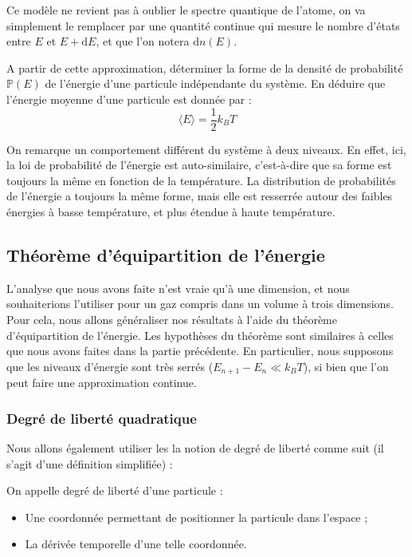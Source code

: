 \documentclass[11pt,fleqn]{book} %
\newcommand{\dd}{\mathrm{d}}
\begin{document}
Ce modèle ne revient pas à oublier le spectre quantique de l'atome, on va simplement le remplacer par une quantité continue qui mesure le nombre d'états entre $E$ et $E+\dd E$, et que l'on notera $\dd n(E)$.

\begin{capex}
	A partir de cette approximation, déterminer la forme de la densité de probabilité $\mathbb{P}(E)$ de l'énergie d'une particule indépendante du système. En déduire que l'énergie moyenne d'une particule est donnée par :
	\begin{equation}
		\langle E \rangle = \frac{1}{2} k_B T
	\end{equation}
\end{capex}

On remarque un comportement différent du système à deux niveaux. En effet, ici, la loi de probabilité de l'énergie est auto-similaire, c'est-à-dire que sa forme est toujours la même en fonction de la température. La distribution de probabilités de l'énergie a toujours la même forme, mais elle est resserrée autour des faibles énergies à basse température, et plus étendue à haute température.

\subsection{Théorème d'équipartition de l'énergie}

L'analyse que nous avons faite n'est vraie qu'à une dimension, et nous souhaiterions l'utiliser pour un gaz compris dans un volume à trois dimensions. Pour cela, nous allons généraliser nos résultats à l'aide du théorème d'équipartition de l'énergie. Les hypothèses du théorème sont similaires à celles que nous avons faites dans la partie précédente. En particulier, nous supposons que les niveaux d'énergie sont très serrés ($E_{n+1}-E_n \ll k_B T$), si bien que l'on peut faire une approximation continue.

\subsubsection{Degré de liberté quadratique}

Nous allons également utiliser les la notion de degré de liberté comme suit (il s'agit d'une définition simplifiée) :
\begin{definition}
	On appelle degré de liberté d'une particule :
	\begin{itemize}
		\item Une coordonnée permettant de positionner la particule dans l'espace ;
		\item La dérivée temporelle d'une telle coordonnée.
	\end{itemize}
\end{definition}
\end{document}
